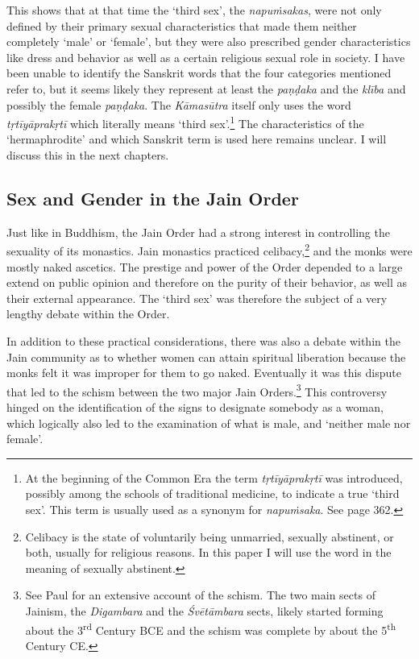 This shows that at that time the `third sex', the {\em napuṁsakas}, were not only defined by their primary sexual characteristics that made them neither completely `male' or `female', but they were also prescribed gender characteristics like dress and behavior as well as a certain religious sexual role in society. I have been unable to identify the Sanskrit words that the four categories mentioned refer to, but it seems likely they represent at least the {\em paṇḍaka} and the {\em klība} and possibly the female {\em paṇḍaka}. The {\em Kāmasūtra} itself only uses the word {\em tṛtīyāprakṛtī} which literally means `third sex'.\footnote{At the beginning of the Common Era the term {\em tṛtīyāprakṛtī} was introduced, possibly among the schools of traditional medicine, to indicate a true `third sex'. This term is usually used as a synonym for {\em napuṁsaka}. See \cite{zwilling} page 362.} The characteristics of the `hermaphrodite' and which Sanskrit term is used here remains unclear. I will discuss this in the next chapters.

\subsection{Sex and Gender in the Jain Order}
Just like in Buddhism, the Jain Order had a strong interest in controlling the sexuality of its monastics. Jain monastics practiced celibacy,\footnote{Celibacy is the state of voluntarily being unmarried, sexually abstinent, or both, usually for religious reasons. In this paper I will use the word in the meaning of sexually abstinent.} and the monks were mostly naked ascetics. The prestige and power of the Order depended to a large extend on public opinion and therefore on the purity of their behavior, as well as their external appearance. The `third sex' was therefore the subject of a very lengthy debate within the Order. 

In addition to these practical considerations, there was also a debate within the Jain community as to whether women can attain spiritual liberation because the monks felt it was improper for them to go naked. Eventually it was this dispute that led to the schism between the two major Jain Orders.\footnote{See Paul \cite{dudas} for an extensive account of the schism. The two main sects of Jainism, the {\em Digambara} and the {\em Śvētāmbara} sects, likely started forming about the 3\textsuperscript{rd} Century BCE and the schism was complete by about the 5\textsuperscript{th} Century CE.} This controversy hinged on the identification of the signs to designate somebody as a woman, which logically also led to the examination of what is male, and `neither male nor female'. 

